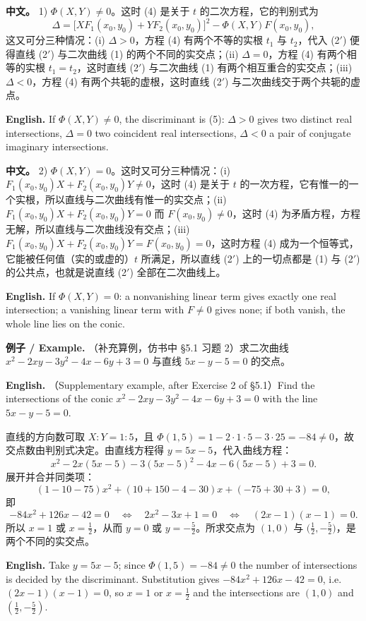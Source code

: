 \documentclass[UTF8,11pt,a4paper]{ctexart}
\newcommand{\APS}[2]{\par\noindent\textbf{中文。} #1\par\noindent\textbf{English.} #2\par\smallskip}
\newcommand{\EN}[1]{\par\noindent \textbf{English.} #1\par}
\newcommand{\EX}[2]{\par\noindent \textbf{例子 / Example.} #1\par\EN{#2}}
\theoremstyle{definition}
\begin{document}
\APS{1) $\Phi(X,Y)\ne0$。这时 (4) 是关于 $t$ 的二次方程，它的判别式为
\[
\Delta=\bigl[XF_1(x_0,y_0)+YF_2(x_0,y_0)\bigr]^2-\Phi(X,Y)F(x_0,y_0),\tag{5}
\]
这又可分三种情况：(i) $\Delta>0$，方程 (4) 有两个不等的实根 $t_1$ 与 $t_2$，代入 (2$'$) 便得直线 (2$'$) 与二次曲线 (1) 的两个不同的实交点；(ii) $\Delta=0$，方程 (4) 有两个相等的实根 $t_1=t_2$，这时直线 (2$'$) 与二次曲线 (1) 有两个相互重合的实交点；(iii) $\Delta<0$，方程 (4) 有两个共轭的虚根，这时直线 (2$'$) 与二次曲线交于两个共轭的虚点。}{If $\Phi(X,Y)\ne0$, the discriminant is (5): $\Delta>0$ gives two distinct real intersections, $\Delta=0$ two coincident real intersections, $\Delta<0$ a pair of conjugate imaginary intersections.}

\APS{2) $\Phi(X,Y)=0$。这时又可分三种情况：(i) $F_1(x_0,y_0)X+F_2(x_0,y_0)Y\ne0$，这时 (4) 是关于 $t$ 的一次方程，它有惟一的一个实根，所以直线与二次曲线有惟一的实交点；(ii) $F_1(x_0,y_0)X+F_2(x_0,y_0)Y=0$ 而 $F(x_0,y_0)\ne0$，这时 (4) 为矛盾方程，方程无解，所以直线与二次曲线没有交点；(iii) $F_1(x_0,y_0)X+F_2(x_0,y_0)Y=F(x_0,y_0)=0$，这时方程 (4) 成为一个恒等式，它能被任何值（实的或虚的）$t$ 所满足，所以直线 (2$'$) 上的一切点都是 (1) 与 (2$'$) 的公共点，也就是说直线 (2$'$) 全部在二次曲线上。}{If $\Phi(X,Y)=0$: a nonvanishing linear term gives exactly one real intersection; a vanishing linear term with $F\ne0$ gives none; if both vanish, the whole line lies on the conic.}

\EX{（补充算例，仿书中 §5.1 习题 2）求二次曲线 $x^2-2xy-3y^2-4x-6y+3=0$ 与直线 $5x-y-5=0$ 的交点。}{（Supplementary example, after Exercise 2 of §5.1）Find the intersections of the conic $x^2-2xy-3y^2-4x-6y+3=0$ with the line $5x-y-5=0$.}
直线的方向数可取 $X:Y=1:5$，且 $\Phi(1,5)=1-2\cdot1\cdot5-3\cdot25=-84\ne0$，故交点数由判别式决定。由直线方程得 $y=5x-5$，代入曲线方程：
\[
x^2-2x(5x-5)-3(5x-5)^2-4x-6(5x-5)+3=0.
\]
展开并合并同类项：
\[
(1-10-75)x^2+(10+150-4-30)x+(-75+30+3)=0,
\]
即
\[
-84x^2+126x-42=0\quad\Longleftrightarrow\quad 2x^2-3x+1=0\quad\Longleftrightarrow\quad (2x-1)(x-1)=0.
\]
所以 $x=1$ 或 $x=\frac12$，从而 $y=0$ 或 $y=-\frac52$。所求交点为 $(1,0)$ 与 $\bigl(\frac12,-\frac52\bigr)$，是两个不同的实交点。
\EN{Take $y=5x-5$; since $\Phi(1,5)=-84\ne0$ the number of intersections is decided by the discriminant. Substitution gives $-84x^2+126x-42=0$, i.e.\ $(2x-1)(x-1)=0$, so $x=1$ or $x=\tfrac12$ and the intersections are $(1,0)$ and $(\tfrac12,-\tfrac52)$.}
\end{document}
